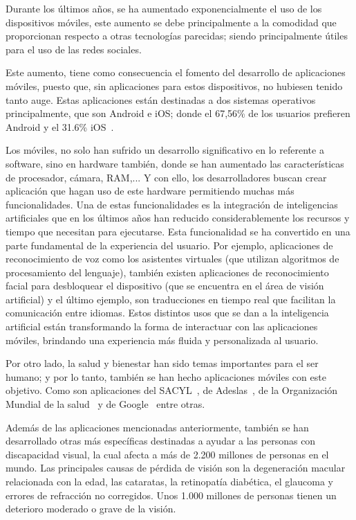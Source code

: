 
Durante los últimos años, se ha aumentado exponencialmente el uso de los dispositivos móviles, este aumento se debe principalmente a la comodidad que proporcionan respecto a otras tecnologías parecidas; siendo principalmente útiles para el uso de las redes sociales. 

Este aumento, tiene como consecuencia el fomento del desarrollo de aplicaciones móviles, puesto que, sin aplicaciones para estos dispositivos, no hubiesen tenido tanto auge. Estas aplicaciones están destinadas a dos sistemas operativos principalmente, que son Android e iOS; donde el 67,56\% de los usuarios prefieren Android y el 31.6\% iOS~\cite{mobile-os-market-share}.

Los móviles, no solo han sufrido un desarrollo significativo en lo referente a software, sino en hardware también, donde se han aumentado las características de procesador, cámara, RAM,... Y con ello, los desarrolladores
buscan crear aplicación que hagan uso de este hardware permitiendo muchas más funcionalidades. Una de estas funcionalidades es la integración de inteligencias artificiales que en los últimos años han reducido considerablemente los recursos y tiempo que necesitan para ejecutarse. Esta funcionalidad se ha convertido en una parte fundamental de la experiencia del usuario. Por ejemplo, aplicaciones de reconocimiento de voz como los asistentes virtuales (que utilizan algoritmos de procesamiento del lenguaje), también existen aplicaciones de reconocimiento facial para desbloquear el dispositivo (que se encuentra en el área de visión artificial) y el último ejemplo, son traducciones en tiempo real que facilitan la comunicación entre idiomas. Estos distintos usos que se dan a la inteligencia artificial están transformando la forma de interactuar con las aplicaciones móviles, brindando una experiencia más fluida y personalizada al usuario.

Por otro lado, la salud y bienestar han sido temas importantes para el ser humano; y por lo tanto, también se han hecho aplicaciones móviles con este objetivo. Como son aplicaciones del SACYL~\cite{sacyl-app}, de Adeslas~\cite{adeslas}, de la Organización Mundial de la salud~\cite{who-infoapp} y de Google~\cite{google-fitness-app} entre otras.


Además de las aplicaciones mencionadas anteriormente, también se han desarrollado otras más específicas destinadas a ayudar a las personas con discapacidad visual, la cual afecta a más de 2.200 millones de personas en el mundo. Las principales causas de pérdida de visión son la degeneración macular relacionada con la edad, las cataratas, la retinopatía diabética, el glaucoma y errores de refracción no corregidos. Unos 1.000 millones de personas tienen un deterioro moderado o grave de la visión\cite{oms-ceguera}.

